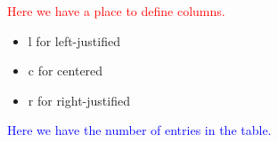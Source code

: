     \begin{enumerate}[label={\Alph*}]
        \textcolor{red}{\item Here we have a place to define columns.}
        \begin{itemize}[label={}]
            \item l for left-justified 
            \item c for centered
            \item r for right-justified
        \end{itemize}
        \textcolor{blue}{\item Here we have the number of entries in the table.}
    \end{enumerate}

